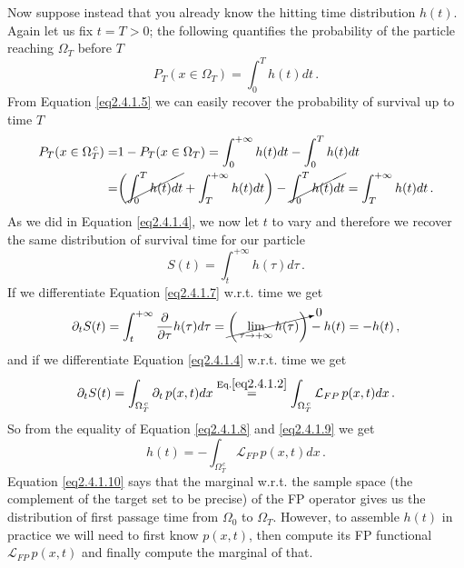 \documentclass[../main.tex]{subfiles}
\begin{document}
Now suppose instead that you already know the hitting time distribution $h(t)$.
Again let us fix $t=T>0$; the following quantifies the probability of the particle reaching $\Omega_{T}$ before $T$
\begin{equation}\label{eq2.4.1.5}
     P_{T}(x\in \Omega_{T}) = \int_{0}^{T}h(t)dt\,.
\end{equation}
From Equation \eqref{eq2.4.1.5} we can easily recover the probability of survival up to time $T$
\begin{align}
      P_{T}(x\in \Omega_{T}^{\,c}) =& 1 - P_{T}(x\in \Omega_{T}) = \int_{0}^{+\infty}h(t)dt - \int_{0}^{T}h(t)dt \nonumber \\
      =& \bigg(\cancel{\int_{0}^{T}h(t)dt} + \int_{T}^{+\infty}h(t)dt \bigg) - \cancel{\int_{0}^{T}h(t)dt} = \int_{T}^{+\infty}h(t)dt \,. \label{eq2.4.1.6}
\end{align}
As we did in Equation \eqref{eq2.4.1.4}, we now let $t$ to vary and therefore we recover the same distribution of survival time for our particle
\begin{equation}\label{eq2.4.1.7}
     S(t) = \int_{t}^{+\infty}h(\tau)d\tau\,.
\end{equation}
If we differentiate Equation \eqref{eq2.4.1.7} w.r.t. time we get
\begin{equation}\label{eq2.4.1.8}
        \partial_{t}S(t) = \int_{t}^{+\infty}\frac{\partial}{\partial\tau} h(\tau)d\tau = \cancelto{0}{\bigg(\lim_{\tau\to+\infty}h(\tau)\bigg)} - h(t) = -h(t)\,,
\end{equation}
and if we differentiate Equation \eqref{eq2.4.1.4} w.r.t. time we get
\begin{equation}\label{eq2.4.1.9}
        \partial_{t}S(t) = \int_{\Omega_{T}^{\,c}}^{}\partial_{t}\,p(x,t)dx \stackrel{\text{Eq.}\eqref{eq2.4.1.2}}{=}\int_{\Omega_{T}^{\,c}}^{}\mathcal{L}_{FP}\, p(x,t)dx\,.
\end{equation}
So from the equality of Equation \eqref{eq2.4.1.8} and \eqref{eq2.4.1.9} we get
\begin{equation}\label{eq2.4.1.10}
     h(t) = -\int_{\Omega_{T}^{\,c}}^{}\mathcal{L}_{FP}\, p(x,t)dx\,.
\end{equation}
Equation \eqref{eq2.4.1.10} says that the marginal w.r.t. the sample space (the complement of the target set to be precise) of the FP operator gives us the distribution of first passage time from $\Omega_{0}$ to $\Omega_{T}$.
However, to assemble $h(t)$ in practice we will need to first know $p(x,t)$, then compute its FP functional $\mathcal{L}_{FP}\, p(x,t)$ and finally compute the marginal of that. 
\end{document}
